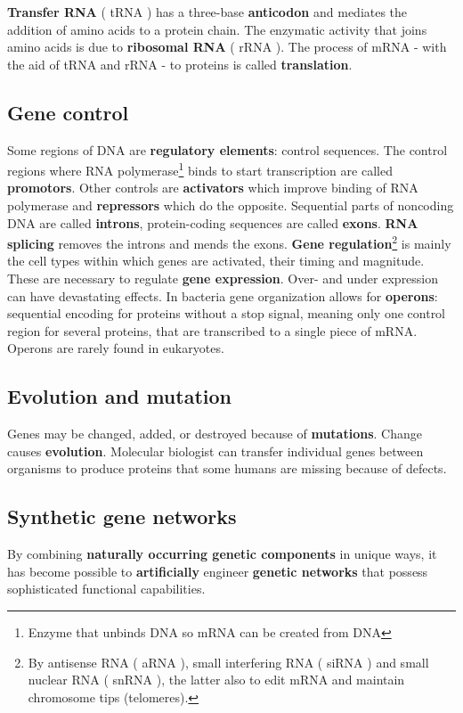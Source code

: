 \documentclass[10pt,a4paper]{report}
\begin{document}
	\textbf{Transfer RNA} ( tRNA ) has a three-base \textbf{anticodon} and mediates the addition of amino acids to a protein chain. 
	The enzymatic activity that joins amino acids is due to \textbf{ribosomal RNA} ( rRNA ). 
	The process of mRNA - with the aid of tRNA and rRNA - to proteins is called \textbf{translation}.
	
	\subsection{Gene control}
	Some regions of DNA are \textbf{regulatory elements}: control sequences. 
	The control regions where RNA polymerase\footnote{Enzyme that unbinds DNA so mRNA can be created from DNA}  binds to start transcription are called \textbf{promotors}. 
	Other controls are \textbf{activators} which improve binding of RNA polymerase and \textbf{repressors} which do the opposite. 
	Sequential parts of noncoding DNA are called \textbf{introns}, protein-coding sequences are called \textbf{exons}. 
	\textbf{RNA splicing} removes the introns and mends the exons. 
	\textbf{Gene regulation}\footnote{By antisense RNA ( aRNA ), small interfering RNA ( siRNA ) and small nuclear RNA ( snRNA ), the latter also to edit mRNA and maintain chromosome tips (telomeres).}  is mainly the cell types within which genes are activated, their timing and magnitude. 
	These are necessary to regulate \textbf{gene expression}. Over- and under expression can have devastating effects. 
	In bacteria gene organization allows for \textbf{operons}: sequential encoding for proteins without a stop signal, meaning only one control region for several proteins, that are transcribed to a single piece of mRNA. 
	Operons are rarely found in eukaryotes.
	
	\subsection{Evolution and mutation}
	Genes may be changed, added, or destroyed because of \textbf{mutations}. 
	Change causes \textbf{evolution}. 
	Molecular biologist can transfer individual genes between organisms to produce proteins that some humans are missing because of defects.
	
	\subsection{Synthetic gene networks}
	By combining \textbf{naturally occurring genetic components} in unique ways, it has become possible to \textbf{artificially} engineer \textbf{genetic networks} that possess sophisticated functional capabilities.
	
\end{document}

